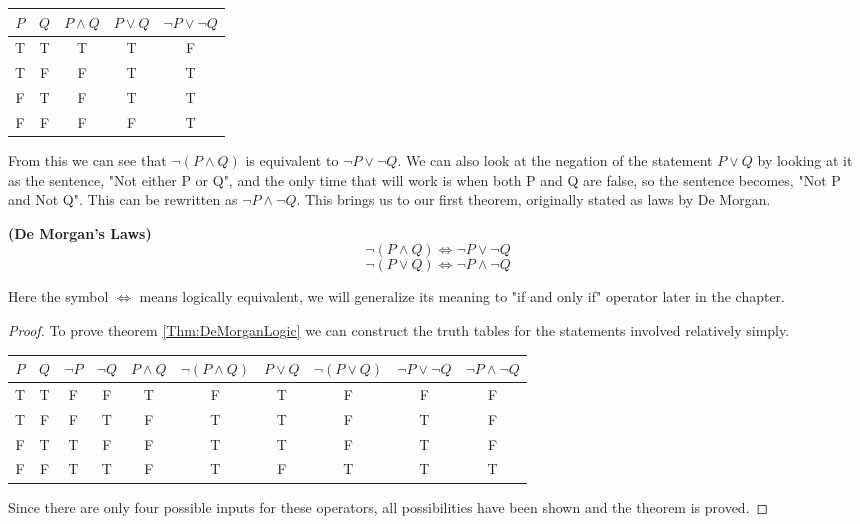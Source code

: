 \begin{center}
	\begin{tabular}{cc|ccc}
		$P$ & $Q$ & $P \land Q$ & $P \lor Q$ & $\neg P \lor \neg Q$ \\
		\hline
		T & T & T & T & F \\
		T & F & F & T & T \\
		F & T & F & T & T \\
		F & F & F & F & T \\
	\end{tabular}
\end{center}

From this we can see that $\neg (P \land Q)$ is equivalent to $\neg P \lor \neg Q$.
We can also look at the negation of the statement $P \lor Q$ by looking at it as the sentence, "Not either P or Q", and the only time that will work is when both P and Q are false, so the sentence becomes, "Not P and Not Q".
This can be rewritten as $\neg P \land \neg Q$.
This brings us to our first theorem, originally stated as laws by De Morgan.

\begin{thm}
	\textbf{(De Morgan's Laws)} \\
	\label{Thm:DeMorganLogic}
	\begin{equation}
		\nonumber
		\neg ( P \land Q ) \iff \neg P \lor \neg Q
	\end{equation}
	\begin{equation}
		\nonumber
		\neg ( P \lor Q ) \iff \neg P \land \neg Q
	\end{equation}
\end{thm}
Here the symbol $\iff$ means logically equivalent, we will generalize its meaning to "if and only if" operator later in the chapter.

\begin{proof}
	To prove theorem \vref{Thm:DeMorganLogic} we can construct the truth tables for the statements involved relatively simply.
	\begin{table*}[ht]
	\begin{center}
	\begin{tabular}{cc|cc|cccccc}
			$P$ & $Q$ & $\neg P$ & $\neg Q$ & $P \land Q$ & $\neg (P \land Q)$ & $P \lor Q$ & $\neg (P \lor Q)$ & $\neg P \lor \neg Q$ & $\neg P \land \neg Q$ \\
			\hline
			T & T & F & F & T & F & T & F & F & F \\
			T & F & F & T & F & T & T & F & T & F \\
			F & T & T & F & F & T & T & F & T & F \\
			F & F & T & T & F & T & F & T & T & T \\
	\end{tabular}
	\end{center}
	\end{table*}
	Since there are only four possible inputs for these operators, all possibilities have been shown and the theorem is proved.
\end{proof}

